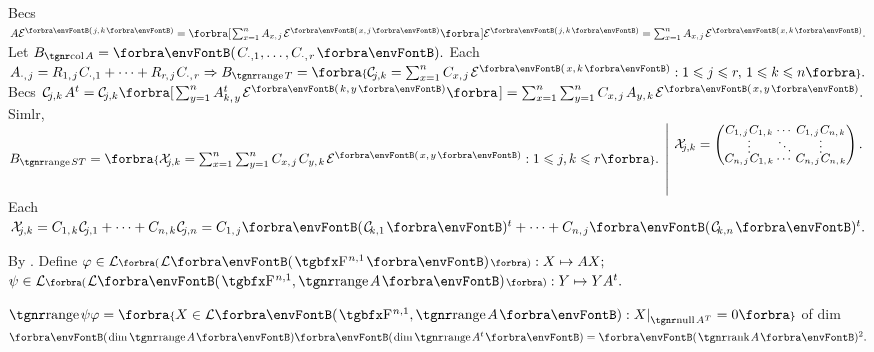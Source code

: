 Becs $A\mEnt{j,\;\!k}=\BigSbra{{\sum_{x=1}^nA_{x,\;\!j}\;\!\mEnt{x,\;\!j}}}\mEnt{j,\;\!k}=\sum_{x=1}^nA_{x,\;\!j}\;\!\mEnt{x,\;\!k}.$ \;Let $B_{\col A}=\Par{C_{\cdot,1},\dots,C_{\cdot,\;\!r}}.$\vspace{3pt}\parSol{}
Each $A_{\cdot,\;\!j}=R_{1,\;\!j}\:\!C_{\cdot,1}+\dots+R_{r\:\!\!,\;\!j}\:\!C_{\cdot,\;\!r}\Rightarrow B_{\range T}=\Bra{\mC_{\!j,k}=\sum_{x=1}^nC_{x,\;\!j}\;\!\mEnt{x,\;\!k}:1\leqslant j\leqslant r,\,1\leqslant k\leqslant n}.$\vspace{5pt}\parSol{}
Becs $\mC_{\!j,k}\;\!A^t=\mC_{\!j,k}\BigSbra{{\sum_{y=1}^nA^t_{k,\;\!y}\;\!\mEnt{k,\;\!y}}}=\sum_{x=1}^n\sum_{y=1}^nC_{x,\;\!j}\;\!A_{y,\;\!k}\;\!\mEnt{x,\;\!y}.$\vspace{-20pt}\parSol{}
Simlr, $B_{\range ST}=\Bra{\mX_{\!j,k}=\sum_{x=1}^n\sum_{y=1}^nC_{x,\;\!j}\;\!C_{y,\;\!k}\;\!\mEnt{x,\;\!y}:1\leqslant j,k\leqslant r}.\;\hMath{l}{\left|}{\right.}{\;\mX_{\!j,k}=\small\begin{pmatrix}C_{1,\;\!j}\:\!C_{1,\;\!k} &\hspace{-8pt} \cdots &\hspace{-8pt} C_{1,\;\!j}\:\!C_{n,\;\!k}\\[-4pt]
		\vdots &\hspace{-8pt} \ddots &\hspace{-8pt} \vdots\\[-4pt]
		C_{n,\;\!j}\:\!C_{1,\;\!k} &\hspace{-8pt} \cdots &\hspace{-8pt} C_{n,\;\!j}\:\!C_{n,\;\!k}\end{pmatrix}.\\[20pt]\,}$\vspace{-19pt}\parSol{}
Each $\mX_{\!j,k}=C_{1,\;\!k}\:\!\mC_{\!j,1}+\dots+C_{n,\;\!k}\:\!\mC_{\!j,n}=C_{1,\;\!j}\Par{\mC_{\!k,1}}{^t}+\dots+C_{n,\;\!j}\Par{\mC_{\!k,n}}{^t}.$\PfEnd\vspace{6pt}\par\quad
\Or By . Define $\varphi\in\Lm[\BigPar]{\Lm{\FbbP{n,1}}}:X\mapsto AX;$ \;$\psi\in\Lm[\BigPar]{\Lm{\FbbP{n,1},\range A}}:Y\mapsto YA^t.$\par\quad
$\range\psi\varphi=\Bra{X\in\Lm{\FbbP{n,1},\range A}:X\mmid_{\null A^T}=0}$ of dim $\Par{{\dim\range A}}\Par{{\dim\range A^t}}=\Par{\rank A}{^2}.$\PfEnd
\SepLine

